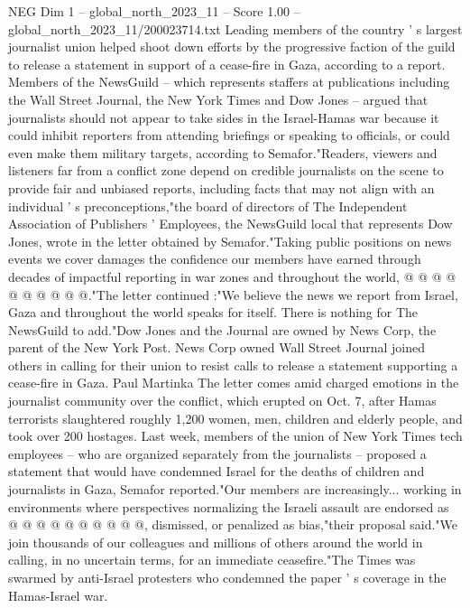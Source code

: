 \begin{textsample}{NEG Dim 1 – global\_north\_2023\_11 – Score 1.00 – global\_north\_2023\_11/200023714.txt}  \label{ex:f1_neg_102}
Leading members of the country ' s largest journalist union helped shoot down efforts by the progressive faction of the guild to release a statement in support of a cease-fire in Gaza, according to a report.
Members of the NewsGuild -- which represents staffers at publications including the Wall Street Journal, the New York Times and Dow Jones -- argued that journalists should not appear to take sides in the Israel-Hamas war because it could inhibit reporters from attending briefings or speaking to officials, or could even make them military targets, according to Semafor."Readers, viewers and listeners far from a conflict zone depend on credible journalists on the scene to provide fair and unbiased reports, including facts that may not align with an individual ' s preconceptions,"the board of directors of The Independent Association of Publishers ' Employees, the NewsGuild local that represents Dow Jones, wrote in the letter obtained by Semafor."Taking public positions on news events we cover damages the confidence our members have earned through decades of impactful reporting in war zones and throughout the world, @ @ @ @ @ @ @ @ @ @."The letter continued :"We believe the news we report from Israel, Gaza and throughout the world speaks for itself.
There is nothing for The NewsGuild to add."Dow Jones and the Journal are owned by News Corp, the parent of the New York Post.
News Corp owned Wall Street Journal joined others in calling for their union to resist calls to release a statement supporting a cease-fire in Gaza.
Paul Martinka The letter comes amid charged emotions in the journalist community over the conflict, which erupted on Oct. 7, after Hamas terrorists slaughtered roughly 1,200 women, men, children and elderly people, and took over 200 hostages.
Last week, members of the union of New York Times tech employees -- who are organized separately from the journalists -- proposed a statement that would have condemned Israel for the deaths of children and journalists in Gaza, Semafor reported."Our members are increasingly... working in environments where perspectives normalizing the Israeli assault are endorsed as @ @ @ @ @ @ @ @ @ @, dismissed, or penalized as bias,"their proposal said."We join thousands of our colleagues and millions of others around the world in calling, in no uncertain terms, for an immediate ceasefire."The Times was swarmed by anti-Israel protesters who condemned the paper ' s coverage in the Hamas-Israel war.

\end{textsample}
